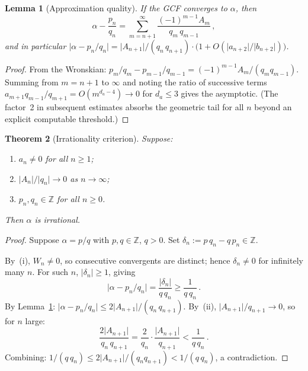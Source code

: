 \documentclass[11pt,a4paper]{article}
\newtheorem{theorem}{Theorem}
\newtheorem{lemma}[theorem]{Lemma}
\theoremstyle{definition}
\theoremstyle{remark}
\newcommand{\abs}[1]{\lvert #1 \rvert}
\begin{document}
\begin{lemma}[Approximation quality]\label{lem:approx}
If the GCF converges to $\alpha$, then
\[
  \alpha - \frac{p_n}{q_n}
  = \sum_{m=n+1}^{\infty} \frac{(-1)^{m-1} A_m}{q_m\, q_{m-1}}\,,
\]
and in particular
$\bigl|\alpha - p_n/q_n\bigr| = \abs{A_{n+1}} / (q_n\, q_{n+1})
 \cdot \bigl(1 + O(\abs{a_{n+2}}/\abs{b_{n+2}})\bigr)$.
\end{lemma}

\begin{proof}
From the Wronskian: $p_m/q_m - p_{m-1}/q_{m-1} = (-1)^{m-1}A_m/(q_m q_{m-1})$.
Summing from $m = n+1$ to $\infty$ and noting the ratio of successive terms
$a_{m+1} q_{m-1}/q_{m+1} = O(m^{d_a - 4}) \to 0$ for $d_a \leq 3$
gives the asymptotic.  (The factor~2 in subsequent estimates absorbs the
geometric tail for all $n$ beyond an explicit computable threshold.)
\end{proof}

\begin{theorem}[Irrationality criterion]\label{thm:irrationality}
Suppose:
\begin{enumerate}
  \item[\emph{(i)}]   $a_n \neq 0$ for all $n \geq 1$;
  \item[\emph{(ii)}]  $\abs{A_n}/\abs{q_n} \to 0$ as $n \to \infty$;
  \item[\emph{(iii)}] $p_n, q_n \in \mathbb{Z}$ for all $n \geq 0$.
\end{enumerate}
Then $\alpha$ is irrational.
\end{theorem}

\begin{proof}
Suppose $\alpha = p/q$ with $p, q \in \mathbb{Z}$, $q > 0$.
Set $\delta_n := p\,q_n - q\,p_n \in \mathbb{Z}$.

By~(i), $W_n \neq 0$, so consecutive convergents are distinct;
hence $\delta_n \neq 0$ for infinitely many $n$.
For such $n$, $\abs{\delta_n} \geq 1$, giving
\[
  \abs{\alpha - p_n/q_n} = \frac{\abs{\delta_n}}{q\,q_n} \geq \frac{1}{q\,q_n}\,.
\]
By Lemma~\ref{lem:approx}:
$\abs{\alpha - p_n/q_n} \leq 2\abs{A_{n+1}}/(q_n\, q_{n+1})$.
By~(ii), $\abs{A_{n+1}}/q_{n+1} \to 0$, so for $n$ large:
\[
  \frac{2\abs{A_{n+1}}}{q_n\, q_{n+1}}
  = \frac{2}{q_n}\cdot\frac{\abs{A_{n+1}}}{q_{n+1}}
  < \frac{1}{q\,q_n}\,.
\]
Combining: $1/(q\,q_n) \leq 2\abs{A_{n+1}}/(q_n q_{n+1}) < 1/(q\,q_n)$,
a contradiction.
\end{proof}


\end{document}
